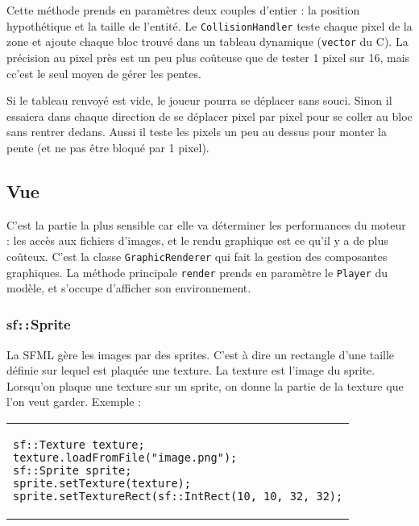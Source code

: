 \documentclass[a4paper,11pt]{article}
\newcommand{\CC}{C\nolinebreak\hspace{-.05em}\raisebox{.4ex}{\tiny\bf +}\nolinebreak\hspace{-.10em}\raisebox{.4ex}{\tiny\bf +}}
\begin{document}
Cette méthode prends en paramètres deux couples d'entier : la position hypothétique et la taille de l'entité. Le \texttt{CollisionHandler} teste chaque pixel de la zone et ajoute chaque bloc trouvé dans un tableau dynamique (\texttt{vector} du \CC). La précision au pixel près est un peu plus coûteuse que de tester 1 pixel sur 16, mais cc'est le seul moyen de gérer les pentes.

Si le tableau renvoyé est vide, le joueur pourra se déplacer sans souci. Sinon il essaiera dans chaque direction de se déplacer pixel par pixel pour se coller au bloc sans rentrer dedans. Aussi il teste les pixels un peu au dessus pour monter la pente (et ne pas être bloqué par 1 pixel).

\vspace{1cm}
\begin{center}
\end{center}
\vspace{1cm}

\subsection{Vue}
C'est la partie la plus sensible car elle va déterminer les performances du moteur : les accès aux fichiers d'images, et le rendu graphique est ce qu'il y a de plus coûteux. C'est la classe \texttt{GraphicRenderer} qui fait la gestion des composantes graphiques. La méthode principale \texttt{render} prends en paramètre le \texttt{Player} du modèle, et s'occupe d'afficher son environnement.

\vspace{1cm}

\subsubsection*{sf\texttt{::}Sprite}
La SFML gère les images par des sprites. C'est à dire un rectangle d'une taille définie sur lequel est plaquée une texture. La texture est l'image du sprite. Lorsqu'on plaque une texture sur un sprite, on donne la partie de la texture que l'on veut garder.
Exemple :
\begin{center}
\begin{tabular}{|l}
\begin{lstlisting}
sf::Texture texture;
texture.loadFromFile("image.png");
sf::Sprite sprite;
sprite.setTexture(texture);
sprite.setTextureRect(sf::IntRect(10, 10, 32, 32);
\end{lstlisting}
\end{tabular}
\end{center}
\end{document}
